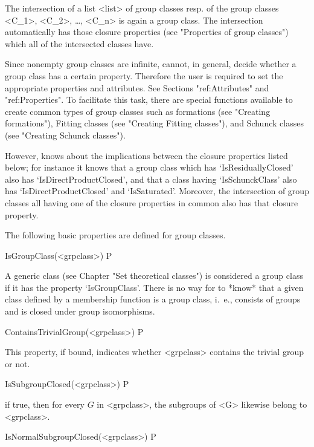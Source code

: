 The intersection of a list <list> of group classes resp. of the group
classes <C_1>, <C_2>, \dots, <C_n> is again
a group class. The intersection automatically has those closure properties
(see "Properties of group classes") which all of the intersected classes
have. 


\null

%
%

Since nonempty group classes are infinite, {\CRISP} cannot, in
general, decide whether a group class has a certain property. Therefore the
user is required to set the appropriate properties and attributes. 
See Sections "ref:Attributes" and "ref:Properties". To facilitate this task, 
there are special functions available to
create common types of group classes such as formations (see "Creating
formations"), Fitting classes (see "Creating Fitting classes"), and Schunck
classes (see "Creating Schunck classes").

However, {\CRISP}
knows about the implications between the closure properties listed below; for
instance it knows that a group class which has `IsResiduallyClosed' also has
`IsDirectProductClosed', and that a class having `IsSchunckClass' also has
`IsDirectProductClosed' and `IsSaturated'. Moreover, the intersection of
group classes all having one of the closure properties in common also has
that closure property.

The following
basic properties are defined for group classes.

\>IsGroupClass(<grpclass>) P

A generic class (see Chapter "Set theoretical classes") is considered a group
class if it has the property `IsGroupClass'. There is no way for {\CRISP} to
*know* that a given class defined by a membership function is a group class,
i.~e., consists of groups and is closed under group isomorphisms.

\> ContainsTrivialGroup(<grpclass>) P

This property, if bound, indicates whether <grpclass> contains the trivial group
or not.

\> IsSubgroupClosed(<grpclass>) P

if true, then for every $G$ in <grpclass>, the subgroups of <G> likewise
belong to <grpclass>.

\> IsNormalSubgroupClosed(<grpclass>) P

